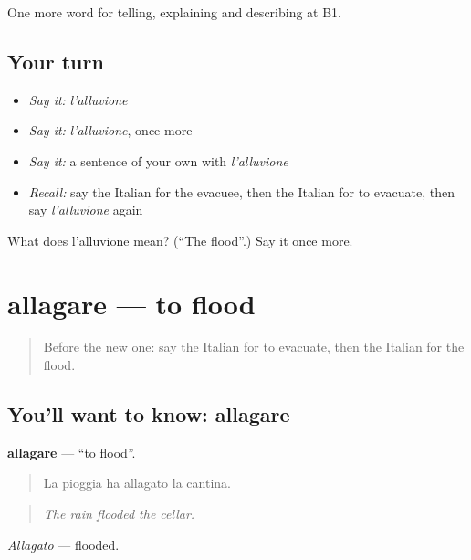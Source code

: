 \begin{grammarlens}[title={What you've built}]
One more word for telling, explaining and describing at B1.
\end{grammarlens}

\subsection*{Your turn}
\begin{itemize}
\raggedright
  \item \emph{Say it:} \emph{l'alluvione}
  \item \emph{Say it:} \emph{l'alluvione}, once more
  \item \emph{Say it:} a sentence of your own with \emph{l'alluvione}
  \item \emph{Recall:} say the Italian for the evacuee, then the Italian for to evacuate, then say \emph{l'alluvione} again
\end{itemize}

\begin{tcolorbox}[breakable,colback=teal!4,colframe=teal!35!black,title={Before you move on}]
What does l'alluvione mean? (\textquotedblleft{}The flood\textquotedblright{}.) Say it once more.
\end{tcolorbox}
\section[allagare]{allagare — to flood}

\label{lesson:IT-C305-allagare}



\begin{quote}
Before the new one: say the Italian for to evacuate, then the Italian for the flood.
\end{quote}

\subsection*{You'll want to know: allagare}
\textbf{allagare} — \textquotedblleft{}to flood\textquotedblright{}.

\begin{quote}
La pioggia ha allagato la cantina.
\end{quote}

\begin{quote}
\emph{The rain flooded the cellar.}
\end{quote}

\emph{Allagato} — flooded.

